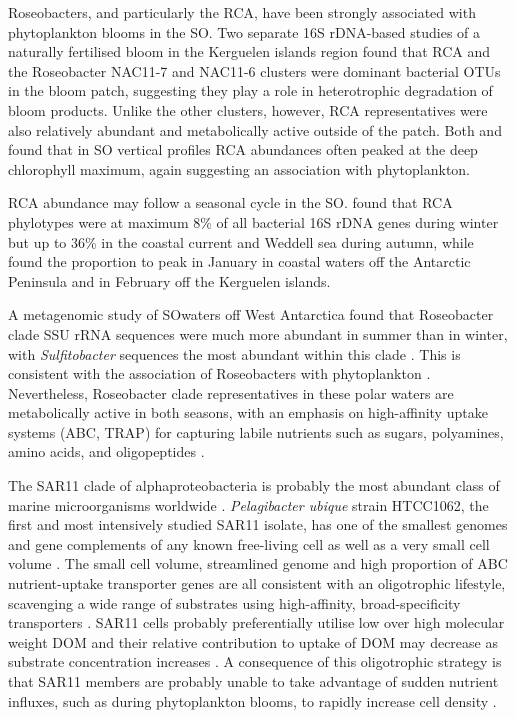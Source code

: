 Roseobacters, and particularly the \ac{RCA}, have been strongly associated with phytoplankton blooms in the \ac{SO}.
Two separate 16S rDNA-based studies of a naturally fertilised bloom in the Kerguelen islands region \cite{West:2008kc,Obernosterer:2011df} found that \ac{RCA} and the Roseobacter NAC11-7 and NAC11-6 clusters were dominant bacterial \acp{OTU} in the bloom patch, suggesting they play a role in heterotrophic degradation of bloom products.
Unlike the other clusters, however, \ac{RCA} representatives were also relatively abundant and metabolically active outside of the patch.
Both \citep{Giebel:2009hr} and \citep{Obernosterer:2011df} found that in \ac{SO} vertical profiles \ac{RCA} abundances often peaked at the deep chlorophyll maximum, again suggesting an association with phytoplankton.

\ac{RCA} abundance may follow a seasonal cycle in the \ac{SO}.
\citep{Giebel:2009hr} found that \ac{RCA} phylotypes were at maximum 8\% of all bacterial 16S rDNA genes during winter but up to 36\% in the coastal current and Weddell sea during autumn, while \citep{Ghiglione:2011ee} found the proportion to peak in January in coastal waters off the Antarctic Peninsula and in February off the Kerguelen islands. 

A metagenomic study of \ac{SO}waters off West Antarctica found that Roseobacter clade \ac{SSU} rRNA sequences were much more abundant in summer than in winter, with \emph{Sulfitobacter} sequences the most abundant within this clade \cite{Grzymski:2012ej}.
This is consistent with the association of Roseobacters with phytoplankton \cite{Moran:2003cwa}.
Nevertheless, Roseobacter clade representatives in these polar waters are metabolically active in both seasons, with an emphasis on high-affinity uptake systems (ABC, TRAP) for capturing labile nutrients such as sugars, polyamines, amino acids, and oligopeptides \cite{Williams:2012bs}.


The SAR11 clade of alphaproteobacteria is probably the most abundant class of marine microorganisms worldwide \cite{Morris:2002bn}.
\emph{Pelagibacter ubique} strain HTCC1062, the first and most intensively studied SAR11 isolate, has one of the smallest genomes and gene complements of any known free-living cell as well as a very small cell volume \cite{Giovannoni:2005ib}.
The small cell volume, streamlined genome and high proportion of ABC nutrient-uptake transporter genes are all consistent with an oligotrophic lifestyle, scavenging a wide range of substrates using high-affinity, broad-specificity transporters \cite{Giovannoni:2005ib,Lauro:2009gx,Sowell:2008ks}.
SAR11 cells probably preferentially utilise low over high molecular weight \ac{DOM} \cite{Malmstrom:2005el} and their relative contribution to uptake of \ac{DOM} may decrease as substrate concentration increases \cite{Alonso:2006dj}.
A consequence of this oligotrophic strategy is that SAR11 members are probably unable to take advantage of sudden nutrient influxes, such as during phytoplankton blooms, to rapidly increase cell density \cite{Tripp:2008dd}.

